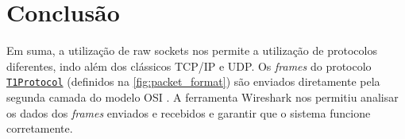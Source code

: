 \section{Conclusão}

Em suma, a utilização de raw sockets nos permite a utilização de protocolos diferentes, indo além dos clássicos TCP/IP e UDP.
Os \textit{frames} do protocolo \hyperref[sec:protocolo]{\lstinline{T1Protocol}} (definidos na \figurename{ \ref{fig:packet_format}}) são enviados diretamente pela segunda camada do modelo OSI \cite{osi_model}.
A ferramenta Wireshark \cite{wireshark} nos permitiu analisar os dados dos \textit{frames} enviados e recebidos e garantir que
o sistema funcione corretamente.
